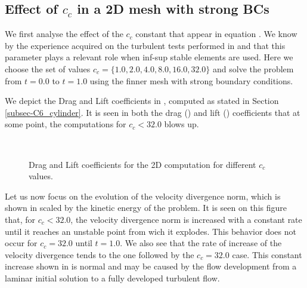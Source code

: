 \subsection{Effect of $ c_c $ in a 2D mesh with strong BCs}
We first analyse the effect of the $ c_c $ constant that appear in equation . We know by the experience acquired on the turbulent tests performed in  and  that this parameter plays a relevant role when inf-sup stable elements are used. Here we choose the set of values $ c_c = \{1.0,2.0,4.0,8.0,16.0,32.0\} $ and solve the problem from $ t=0.0 $ to $ t=1.0 $ using the finner mesh with strong boundary conditions.

We depict the Drag and Lift coefficients in , computed as stated in Section \ref{subsec-C6_cylinder}. It is seen in both the drag () and lift () coefficients that at some point, the computations for $ c_c<32.0 $ blows up.
\begin{figure}[h!]
  \centering
  \\
  \caption{Drag and Lift coefficients for the 2D computation for different $ c_c $ values.}
  \label{fig-NACA_c_c_drag_lift}
\end{figure}
Let us now focus on the evolution of the velocity divergence norm, which is shown in  scaled by the kinetic energy of the problem. It is seen on this figure that, for $ c_c<32.0 $, the velocity divergence norm is increased with a constant rate until it reaches an unstable point from wich it explodes. This behavior does not occur for $ c_c=32.0 $ until $ t=1.0 $. We also see that the rate of increase of the velocity divergence tends to the one followed by the $ c_c=32.0 $ case. This constant increase shown in  is normal and may be caused by the flow development from a laminar initial solution to a fully developed turbulent flow.
